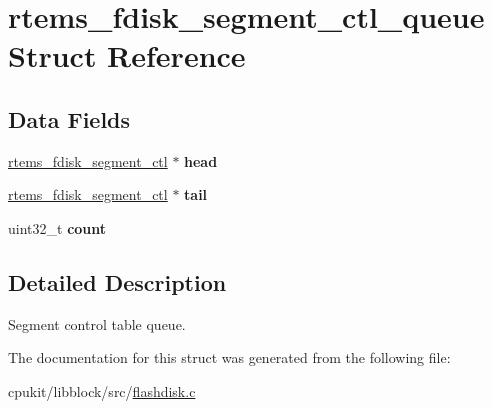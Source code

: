 \hypertarget{structrtems__fdisk__segment__ctl__queue}{}\section{rtems\+\_\+fdisk\+\_\+segment\+\_\+ctl\+\_\+queue Struct Reference}
\label{structrtems__fdisk__segment__ctl__queue}
\subsection*{Data Fields}
\begin{DoxyCompactItemize}
\item 
\mbox{\label{structrtems__fdisk__segment__ctl__queue_a1078992bbef773d2182e467d89e0ba7a}} 
\mbox{\hyperlink{structrtems__fdisk__segment__ctl}{rtems\+\_\+fdisk\+\_\+segment\+\_\+ctl}} $\ast$ {\bfseries head}
\item 
\mbox{\label{structrtems__fdisk__segment__ctl__queue_aa0ae8176074ea7391df1ec381c8660c1}} 
\mbox{\hyperlink{structrtems__fdisk__segment__ctl}{rtems\+\_\+fdisk\+\_\+segment\+\_\+ctl}} $\ast$ {\bfseries tail}
\item 
\mbox{\label{structrtems__fdisk__segment__ctl__queue_ac23ca7bc5336413aab5c65cf4afc8b84}} 
uint32\+\_\+t {\bfseries count}
\end{DoxyCompactItemize}


\subsection{Detailed Description}
Segment control table queue. 

The documentation for this struct was generated from the following file\+:\begin{DoxyCompactItemize}
\item 
cpukit/libblock/src/\mbox{\hyperlink{flashdisk_8c}{flashdisk.\+c}}\end{DoxyCompactItemize}
